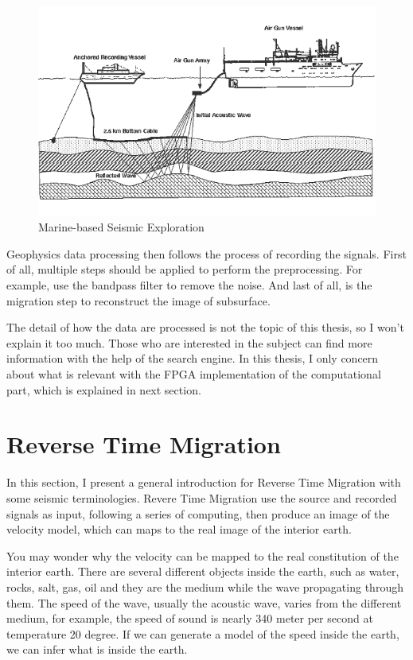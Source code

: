 \begin{figure}
  \centering
  \includegraphics[scale=0.5]{img/Seafloor_Seismic.png}
  \caption{Marine-based Seismic Exploration}
  \label{fig:sea_floor_seismic}
\end{figure}

Geophysics data processing then follows the process of recording the
signals. First of all, multiple steps should be applied to perform the
preprocessing. For example, use the bandpass filter to remove the noise.
And last of all, is the migration step to reconstruct the image of
subsurface.

The detail of how the data are processed is not the topic of this thesis,
so I won't explain it too much. Those who are interested in the subject can
find more information with the help of the search engine. In this thesis, I
only concern about what is relevant with the FPGA implementation of the
computational part, which is explained in next section.

\section{Reverse Time Migration}

In this section, I present a general introduction for Reverse Time
Migration with some seismic terminologies. Revere Time Migration use the
source and recorded signals as input, following a series of computing, then
produce an image of the velocity model, which can maps to the real image of
the interior earth.

You may wonder why the velocity can be mapped to the real constitution of
the interior earth. There are several different objects inside the earth,
such as water, rocks, salt, gas, oil and they are the medium while the wave
propagating through them. The speed of the wave, usually the acoustic wave,
varies from the different medium, for example, the speed of sound is nearly
340 meter per second at temperature 20 degree. If we can generate a model
of the speed inside the earth, we can infer what is inside the earth.

